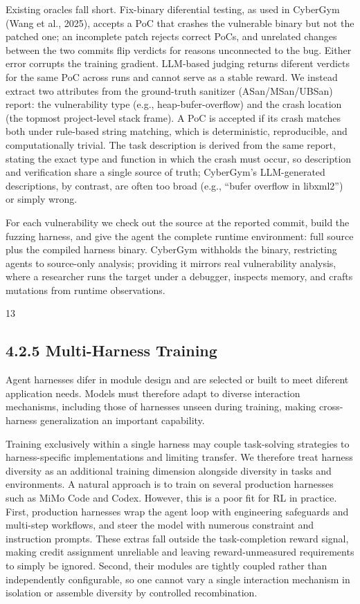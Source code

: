 \documentclass[
  10
]{article}
\begin{document}
Existing oracles fall short. Fix-binary diferential testing, as used in
CyberGym (Wang et al., 2025), accepts a PoC that crashes the vulnerable
binary but not the patched one; an incomplete patch rejects correct
PoCs, and unrelated changes between the two commits flip verdicts for
reasons unconnected to the bug. Either error corrupts the training
gradient. LLM-based judging returns diferent verdicts for the same PoC
across runs and cannot serve as a stable reward. We instead extract two
attributes from the ground-truth sanitizer (ASan/MSan/UBSan) report: the
vulnerability type (e.g., heap-bufer-overflow) and the crash location
(the topmost project-level stack frame). A PoC is accepted if its crash
matches both under rule-based string matching, which is deterministic,
reproducible, and computationally trivial. The task description is
derived from the same report, stating the exact type and function in
which the crash must occur, so description and verification share a
single source of truth; CyberGym's LLM-generated descriptions, by
contrast, are often too broad (e.g., ``bufer overflow in libxml2'') or
simply wrong.

For each vulnerability we check out the source at the reported commit,
build the fuzzing harness, and give the agent the complete runtime
environment: full source plus the compiled harness binary. CyberGym
withholds the binary, restricting agents to source-only analysis;
providing it mirrors real vulnerability analysis, where a researcher
runs the target under a debugger, inspects memory, and crafts mutations
from runtime observations.

13

\subsection{4.2.5 Multi-Harness Training}\label{multi-harness-training}

Agent harnesses difer in module design and are selected or built to meet
diferent application needs. Models must therefore adapt to diverse
interaction mechanisms, including those of harnesses unseen during
training, making cross-harness generalization an important capability.

Training exclusively within a single harness may couple task-solving
strategies to harness-specific implementations and limiting transfer. We
therefore treat harness diversity as an additional training dimension
alongside diversity in tasks and environments. A natural approach is to
train on several production harnesses such as MiMo Code and Codex.
However, this is a poor fit for RL in practice. First, production
harnesses wrap the agent loop with engineering safeguards and multi-step
workflows, and steer the model with numerous constraint and instruction
prompts. These extras fall outside the task-completion reward signal,
making credit assignment unreliable and leaving reward-unmeasured
requirements to simply be ignored. Second, their modules are tightly
coupled rather than independently configurable, so one cannot vary a
single interaction mechanism in isolation or assemble diversity by
controlled recombination.
\end{document}
